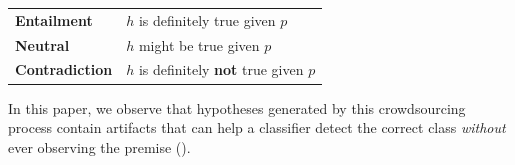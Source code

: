 % 
\begin{table}[h]
\vspace{-0.5em}
\begin{tabular}{ll}
\textbf{Entailment}    & $h$ is definitely true given $p$ \\
\textbf{Neutral}       & $h$ might be true given $p$ \\
\textbf{Contradiction} & $h$ is definitely {\bf not} true given $p$ \\
\end{tabular}
\vspace{-1em}
\end{table}
\noindent
In this paper, we observe that hypotheses generated by this crowdsourcing process contain artifacts that can help a classifier detect the correct class \textit{without} ever observing the premise ().

